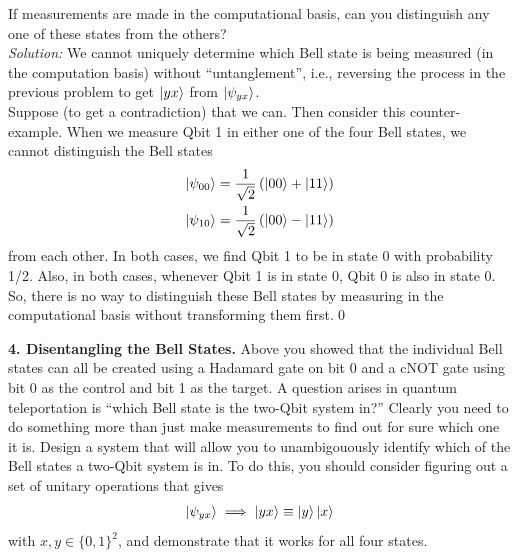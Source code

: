 \documentclass{book}
\theoremstyle{definition}
\newcommand{\nn}{\nonumber}
\newcommand{\f}[2]{\frac{#1}{#2}}
\newcommand{\lp}{\left(}
\newcommand{\rp}{\right)}
\begin{document}
\noindent If measurements are made in the computational basis, can you distinguish any one of these states from the others?\\




\noindent \textit{Solution:} We cannot uniquely determine which Bell state is being measured (in the computation basis) without ``untanglement'', i.e., reversing the process in the previous problem to get $\ket{yx}$ from $\ket{\psi_{yx}}$.\\

Suppose (to get a contradiction) that we can. Then consider this counter-example. When we measure Qbit 1 in either one of the four Bell states, we cannot distinguish the Bell states
\begin{align}
\ket{\psi_{00}} = \f{1}{\sqrt{2}}\lp \ket{00} + \ket{11} \rp\nn\\
\ket{\psi_{10}} = \f{1}{\sqrt{2}}\lp \ket{00} - \ket{11} \rp
\end{align}
from each other. In both cases, we find Qbit 1 to be in state 0 with probability 1/2. Also, in both cases, whenever Qbit 1 is in state 0, Qbit 0 is also in state 0. So, there is no way to distinguish these Bell states by measuring in the computational basis without transforming them first.\qed




\newpage















\noindent \textbf{4. Disentangling the Bell States.} Above you showed that the individual Bell states can all be created using a Hadamard gate on bit 0 and a cNOT gate using bit 0 as the control and bit 1 as the target. A question arises in quantum teleportation is ``which Bell state is the two-Qbit system in?'' Clearly you need to do something more than just make measurements to find out for sure which one it is. Design a system that will allow you to unambigouously identify which of the Bell states a two-Qbit system is in. To do this, you should consider figuring out a set of unitary operations that gives
\begin{align}
\ket{\psi_{yx}} \implies \ket{yx} \equiv \ket{y}\ket{x}
\end{align}
with $x,y \in \{0,1\}^2$, and demonstrate that it works for all four states.\\
\end{document}
